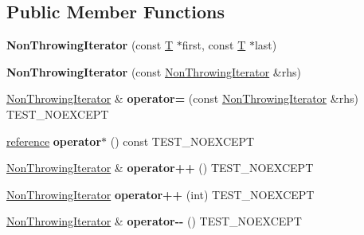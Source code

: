 \subsection*{Public Member Functions}
\begin{DoxyCompactItemize}
\item 
\mbox{\label{struct_non_throwing_iterator_ae0ab02f356688bc6a7299c57d5e33dba}} 
{\bfseries Non\+Throwing\+Iterator} (const \mbox{\hyperlink{struct_t}{T}} $\ast$first, const \mbox{\hyperlink{struct_t}{T}} $\ast$last)
\item 
\mbox{\label{struct_non_throwing_iterator_a9a6930a9f8eb5f3090ab2083727fbfbe}} 
{\bfseries Non\+Throwing\+Iterator} (const \mbox{\hyperlink{struct_non_throwing_iterator}{Non\+Throwing\+Iterator}} \&rhs)
\item 
\mbox{\label{struct_non_throwing_iterator_ae25bb5c41c082ff593b7926dbf6acbee}} 
\mbox{\hyperlink{struct_non_throwing_iterator}{Non\+Throwing\+Iterator}} \& {\bfseries operator=} (const \mbox{\hyperlink{struct_non_throwing_iterator}{Non\+Throwing\+Iterator}} \&rhs) T\+E\+S\+T\+\_\+\+N\+O\+E\+X\+C\+E\+PT
\item 
\mbox{\label{struct_non_throwing_iterator_a43e60e6326f721777664bc73120ebfa1}} 
\mbox{\hyperlink{struct_t}{reference}} {\bfseries operator$\ast$} () const T\+E\+S\+T\+\_\+\+N\+O\+E\+X\+C\+E\+PT
\item 
\mbox{\label{struct_non_throwing_iterator_a0531e2985e902f868962b6d9136866d5}} 
\mbox{\hyperlink{struct_non_throwing_iterator}{Non\+Throwing\+Iterator}} \& {\bfseries operator++} () T\+E\+S\+T\+\_\+\+N\+O\+E\+X\+C\+E\+PT
\item 
\mbox{\label{struct_non_throwing_iterator_a4fb7374398a01c1a3f3cce6e6abb1fef}} 
\mbox{\hyperlink{struct_non_throwing_iterator}{Non\+Throwing\+Iterator}} {\bfseries operator++} (int) T\+E\+S\+T\+\_\+\+N\+O\+E\+X\+C\+E\+PT
\item 
\mbox{\label{struct_non_throwing_iterator_a32eac4d7480d5fb8f07e42df51c3a1ab}} 
\mbox{\hyperlink{struct_non_throwing_iterator}{Non\+Throwing\+Iterator}} \& {\bfseries operator-\/-\/} () T\+E\+S\+T\+\_\+\+N\+O\+E\+X\+C\+E\+PT

\end{DoxyCompactItemize}

